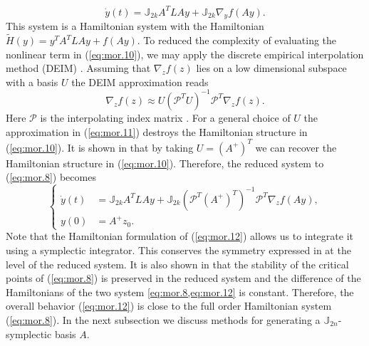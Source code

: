 \begin{equation} \label{eq:mor.10}
	\dot y(t) = \mathbb J_{2k} A^T L A y + \mathbb J_{2k} \nabla_y f(Ay).
\end{equation}
This system is a Hamiltonian system with the Hamiltonian $\tilde H(y) = y^T A^T L A y + f(Ay)$. To reduced the complexity of evaluating the nonlinear term in (\ref{eq:mor.10}), we may apply the discrete empirical interpolation method (DEIM) \cite{barrault2004empirical,Chaturantabut:2010cz}. Assuming that $\nabla_z f(z)$ lies on a low dimensional subspace with a basis $U$ the DEIM approximation reads
\begin{equation} \label{eq:mor.11}
	\nabla_z f(z) \approx U (\mathcal P^T U)^{-1} \mathcal P^T \nabla_z f(z).
\end{equation}
Here $\mathcal P$ is the interpolating index matrix \cite{Chaturantabut:2010cz}. For a general choice of $U$ the approximation in (\ref{eq:mor.11}) destroys the Hamiltonian structure in (\ref{eq:mor.10}). It is shown in \cite{doi:10.1137/17M1111991} that by taking $U = (A^+)^T$ we can recover the Hamiltonian structure in (\ref{eq:mor.10}). Therefore, the reduced system to (\ref{eq:mor.8}) becomes
\begin{equation} \label{eq:mor.12}
\left\{
\begin{aligned}
	\dot y(t) &= \mathbb J_{2k} A^T L A y + \mathbb J_{2k} (\mathcal P^T (A^+)^T)^{-1} \mathcal P^T \nabla_z f(Ay), \\
	y(0) &= A^+ z_0.
\end{aligned}
\right.
\end{equation}
Note that the Hamiltonian formulation of (\ref{eq:mor.12}) allows us to integrate it using a symplectic integrator. This conserves the symmetry expressed in  at the level of the reduced system. It is also shown in \cite{doi:10.1137/17M1111991,doi:10.1137/140978922} that the stability of the critical points of (\ref{eq:mor.8}) is preserved in the reduced system and the difference of the Hamiltonians of the two system \cref{eq:mor.8,eq:mor.12} is constant. Therefore, the overall behavior (\ref{eq:mor.12}) is close to the full order Hamiltonian system (\ref{eq:mor.8}). In the next subsection we discuss methods for generating a $\mathbb J_{2n}$-symplectic basis $A$.

